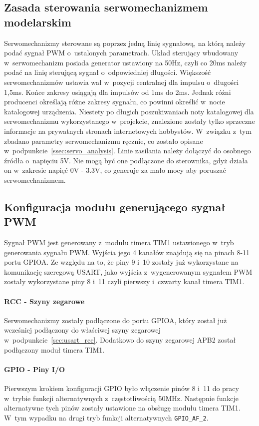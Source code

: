 \documentclass[eng,oneside]{mgr}
\begin{document}
			\subsection{Zasada sterowania serwomechanizmem modelarskim}
			Serwomechanizmy sterowane są poprzez jedną linię sygnałową, na którą należy podać sygnał PWM o~ustalonych parametrach. Układ sterujący wbudowany w~serwomechanizm posiada generator ustawiony na 50Hz, czyli co 20ms należy podać na linię sterującą sygnał o~odpowiedniej długości. Większość serwomechanizmów ustawia wał w~pozycji centralnej dla impulsu o~długości 1,5ms. Końce zakresy osiągają dla impulsów od 1ms do 2ms. Jednak różni producenci określają różne zakresy sygnału, co powinni określić w~nocie katalogowej urządzenia. Niestety po długich poszukiwaniach noty katalogowej dla serwomechanizmu wykorzystanego w~projekcie, znalezione zostały tylko sprzeczne informacje na prywatnych stronach internetowych hobbystów. W~związku z~tym zbadano parametry serwomechanizmu ręcznie, co zostało opisane w~podpunkcie~\ref{ssec:servo_analysis}. Linie zasilania należy dołączyć do osobnego źródła o~napięciu 5V. Nie mogą być one podłączone do sterownika, gdyż działa on w~zakresie napięć 0V - 3.3V, co generuje za mało mocy aby poruszać serwomechanizmem.

			\subsection{Konfiguracja modułu generującego sygnał PWM}
			Sygnał PWM jest generowany z~modułu timera TIM1 ustawionego w~tryb generowania sygnału PWM. Wyjścia jego 4 kanałów znajdują się na pinach 8-11 portu GPIOA. Ze względu na to, że piny 9 i~10 zostały już wykorzystane na komunikację szeregową USART, jako wyjścia z~wygenerowanym sygnałem PWM zostały wykorzystane piny 8 i~11 czyli pierwszy i~czwarty kanał timera TIM1. 

				\paragraph{RCC - Szyny zegarowe}
				Serwomechanizmy zostały podłączone do portu GPIOA, który został już wcześniej podłączony do właściwej szyny zegarowej w~podpunkcie~\ref{sec:usart_rcc}. Dodatkowo do szyny zegarowej APB2 został podłączony moduł timera TIM1.

				\paragraph{GPIO - Piny I/O}
				Pierwszym krokiem konfiguracji GPIO było włączenie pinów 8 i~11 do pracy w~trybie funkcji alternatywnych z~częstotliwością 50MHz. Następnie funkcje alternatywne tych pinów zostały ustawione na obsługę modułu timera TIM1. W~tym wypadku na drugi tryb funkcji alternatywnych \texttt{GPIO\_AF\_2}.
\end{document}
